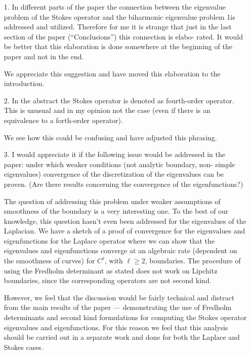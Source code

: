 \documentclass{article}
\begin{document}
\begin{itemize}
\item[1.] {\color{blue} In different parts of the paper the connection between the eigenvalue
problem of the Stokes operator and the biharmonic eigenvalue problem
1is addressed and utilized. Therefore for me it is strange that just in
the last section of the paper (“Conclusions”) this connection is elabo-
rated. It would be better that this elaboration is done somewhere at
the beginning of the paper and not in the end.}

We appreciate this suggestion and have moved this elaboration to
the introduction. 

\item[2.] {\color{blue}
  In the abstract the Stokes operator is denoted as fourth-order operator.
This is unusual and in my opinion not the case (even if there is an
equivalence to a forth-order operator).}

We see how this could be confusing and have adjusted this phrasing.

\item[3.] {\color{blue} I would appreciate it if the following issue would be addressed in the
paper: under which weaker conditions (not analytic boundary, non-
simple eigenvalues) convergence of the discretization of the eigenvalues
can be proven. (Are there results concerning the convergence of the
eigenfunctions?)}

The question of addressing this problem under weaker assumptions of smoothness of the boundary
is a very interesting one. To the best of our knowledge, this
question hasn't even been addressed for the eigenvalues of the Laplacian.
We have a sketch of a proof of convergence for the eigenvalues and eigenfunctions
for the Laplace operator where we can show that the eigenvalues and eigenfunctions
converge at an algebraic rate (dependent on the smoothness of curves) for $C^{\ell}$,
with $\ell\geq 2$, boundaries. The procedure of using the Fredholm determinant as
stated does not work on Lipchitz boundaries, since the corresponding operators are
not second kind. 

However, we feel that the discussion would be fairly technical and distract
from the main results of the paper --- demonstrating the use of Fredholm determinants
and second kind formulations for computing the Stokes operator eigenvalues and
eigenfunctions.  For this reason we feel that this analysis should be carried out in
a separate work and done for both the Laplace and Stokes cases.


\end{itemize}
\end{document}

